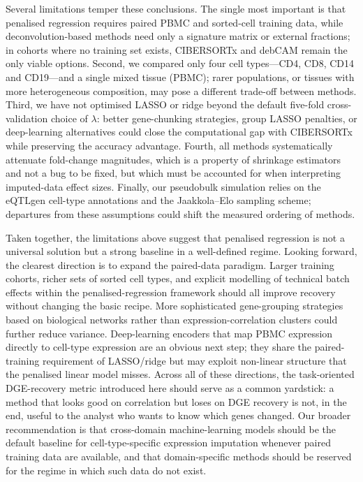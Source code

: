 \documentclass[11pt]{article}
\begin{document}
Several limitations temper these conclusions. The single most
important is that penalised regression requires paired PBMC and
sorted-cell training data, while deconvolution-based methods need only
a signature matrix or external fractions; in cohorts where no training
set exists, CIBERSORTx and debCAM remain the only viable options.
Second, we compared only four cell types---CD4, CD8, CD14 and
CD19---and a single mixed tissue (PBMC); rarer populations, or tissues
with more heterogeneous composition, may pose a different trade-off
between methods. Third, we have not optimised LASSO or ridge beyond
the default five-fold cross-validation choice of $\lambda$: better
gene-chunking strategies, group LASSO penalties, or deep-learning
alternatives could close the computational gap with CIBERSORTx while
preserving the accuracy advantage. Fourth, all methods systematically
attenuate fold-change magnitudes, which is a property of shrinkage
estimators and not a bug to be fixed, but which must be accounted for
when interpreting imputed-data effect sizes. Finally, our pseudobulk
simulation relies on the eQTLgen cell-type annotations and the
Jaakkola--Elo sampling scheme; departures from these assumptions could
shift the measured ordering of methods.

Taken together, the limitations above suggest that penalised
regression is not a universal solution but a strong baseline in a
well-defined regime. Looking forward, the clearest direction is to
expand the paired-data paradigm. Larger training cohorts, richer sets of sorted cell types,
and explicit modelling of technical batch effects within the
penalised-regression framework should all improve recovery without
changing the basic recipe. More sophisticated gene-grouping strategies
based on biological networks rather than expression-correlation
clusters could further reduce variance. Deep-learning encoders that
map PBMC expression directly to cell-type expression are an obvious
next step; they share the paired-training requirement of LASSO/ridge
but may exploit non-linear structure that the penalised linear model
misses. Across all of these directions, the task-oriented
DGE-recovery metric introduced here should serve as a common
yardstick: a method that looks good on correlation but loses on DGE
recovery is not, in the end, useful to the analyst who wants to know
which genes changed. Our broader recommendation is that cross-domain
machine-learning models should be the default baseline for
cell-type-specific expression imputation whenever paired training data
are available, and that domain-specific methods should be reserved
for the regime in which such data do not exist.



\end{document}
